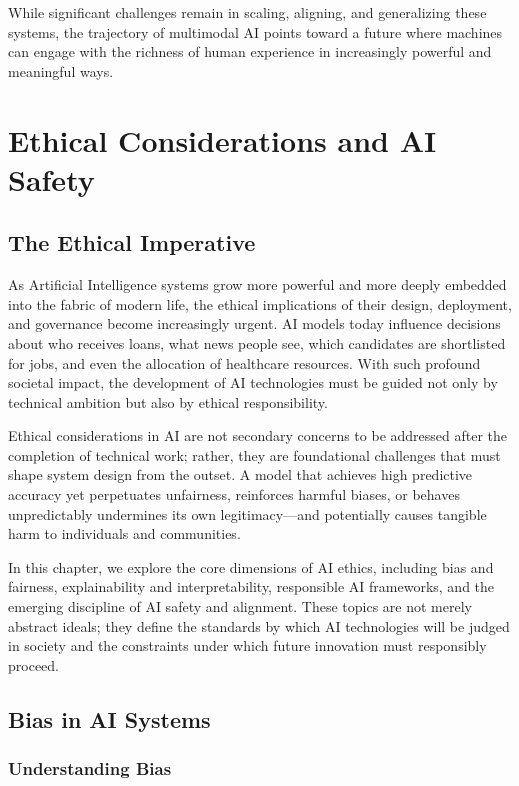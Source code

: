 \documentclass[openany]{book}
\begin{document}
While significant challenges remain in scaling, aligning, and generalizing these 
systems, the trajectory of multimodal AI points toward a future where machines can 
engage with the richness of human experience in increasingly powerful and 
meaningful ways.

\chapter{Ethical Considerations and AI Safety}

\section{The Ethical Imperative}

As Artificial Intelligence systems grow more powerful and more deeply embedded
into the fabric of modern life, the ethical implications of their design,
deployment, and governance become increasingly urgent. AI models today
influence decisions about who receives loans, what news people see, which
candidates are shortlisted for jobs, and even the allocation of healthcare
resources. With such profound societal impact, the development of AI
technologies must be guided not only by technical ambition but also by ethical
responsibility.

Ethical considerations in AI are not secondary concerns to be addressed after
the completion of technical work; rather, they are foundational challenges that
must shape system design from the outset. A model that achieves high predictive
accuracy yet perpetuates unfairness, reinforces harmful biases, or behaves
unpredictably undermines its own legitimacy---and potentially causes tangible
harm to individuals and communities.

In this chapter, we explore the core dimensions of AI ethics, including bias
and fairness, explainability and interpretability, responsible AI frameworks,
and the emerging discipline of AI safety and alignment. These topics are not
merely abstract ideals; they define the standards by which AI technologies will
be judged in society and the constraints under which future innovation must
responsibly proceed.

\section{Bias in AI Systems}

\subsection{Understanding Bias}
\end{document}

